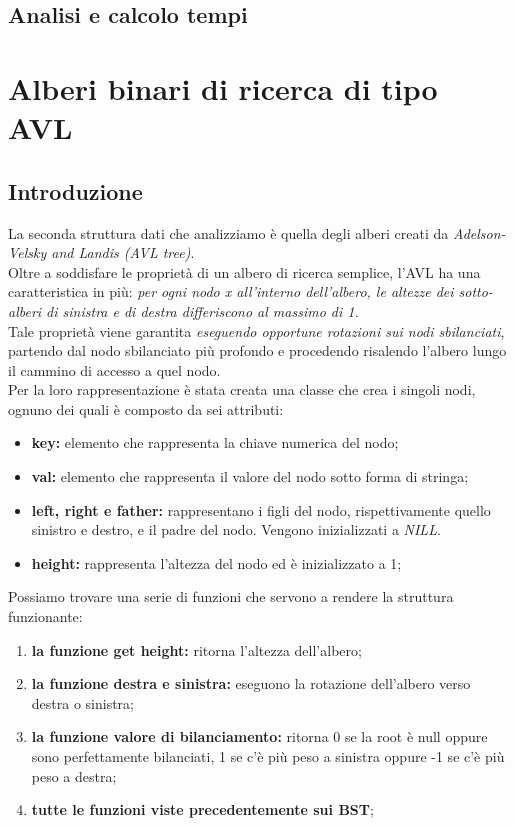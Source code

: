 \documentclass[a4paper]{article}
\begin{document}
		 	\subsection{Analisi e calcolo tempi}
	   	 \newpage
		\section{Alberi binari di ricerca di tipo AVL}
			\subsection{Introduzione}
			La seconda struttura dati che analizziamo è quella degli alberi creati da \textit{Adelson-Velsky and Landis (AVL tree)}.\\
			Oltre a soddisfare le proprietà di un albero di ricerca semplice, l'AVL ha una caratteristica in più: \textit{per ogni nodo x all'interno dell'albero, le altezze dei sotto-alberi di sinistra e di destra differiscono al massimo di 1.}\\
			Tale proprietà viene garantita \textit{eseguendo opportune rotazioni sui nodi sbilanciati}, partendo dal nodo sbilanciato più profondo e procedendo risalendo l'albero lungo il cammino di accesso a quel nodo.\\
			Per la loro rappresentazione è stata creata una classe che crea i singoli nodi, ognuno dei quali è composto da sei attributi:
			\begin{itemize}
				\item \textbf{key:} elemento che rappresenta la chiave numerica del nodo;
				\item \textbf{val:} elemento che rappresenta il valore del nodo sotto forma di stringa;
				\item \textbf{left, right e father:} rappresentano i figli del nodo, rispettivamente quello sinistro e destro, e il padre del nodo. Vengono inizializzati a \textit{NILL}.
				\item \textbf{height:} rappresenta l'altezza del nodo ed è inizializzato a 1;
			\end{itemize}
			Possiamo trovare una serie di funzioni che servono a rendere la struttura funzionante:
			\begin{enumerate}
				\item \textbf{la funzione get height:} ritorna l'altezza dell'albero;
				\item \textbf{la funzione destra e sinistra:} eseguono la rotazione dell'albero verso destra o sinistra;
				\item \textbf{la funzione valore di bilanciamento:} ritorna 0 se la root è null oppure sono perfettamente bilanciati, 1 se c'è più peso a sinistra oppure -1 se c'è più peso a destra;
				\item \textbf{tutte le funzioni viste precedentemente sui BST};
			\end{enumerate}
			
\end{document}
